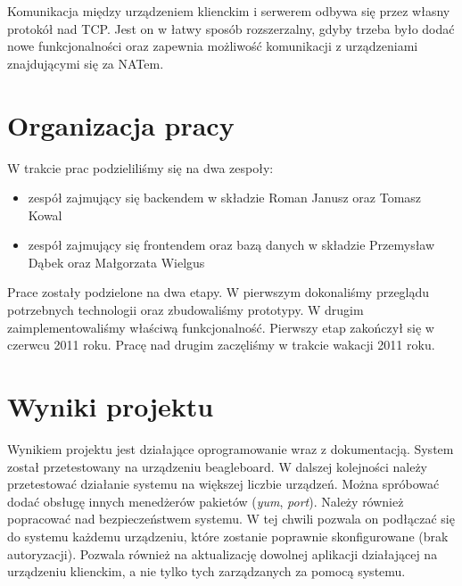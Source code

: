 \documentclass[polish,12pt]{aghthesis}
\begin{document}
Komunikacja między urządzeniem klienckim i serwerem odbywa się przez własny protokół nad TCP. Jest on w łatwy sposób rozszerzalny, gdyby trzeba było dodać nowe funkcjonalności oraz zapewnia możliwość komunikacji z urządzeniami znajdującymi się za NATem.

\section{Organizacja pracy}

W trakcie prac podzieliliśmy się na dwa zespoły:
\begin{itemize}
\item zespół zajmujący się backendem w składzie Roman Janusz oraz Tomasz Kowal
\item zespół zajmujący się frontendem oraz bazą danych w składzie Przemysław Dąbek oraz Małgorzata Wielgus
\end{itemize}

Prace zostały podzielone na dwa etapy. W pierwszym dokonaliśmy przeglądu potrzebnych technologii oraz zbudowaliśmy prototypy. W drugim zaimplementowaliśmy właściwą funkcjonalność.
Pierwszy etap zakończył się w czerwcu 2011 roku. Pracę nad drugim zaczęliśmy w trakcie wakacji 2011 roku.

\section{Wyniki projektu}

Wynikiem projektu jest działające oprogramowanie wraz z dokumentacją. System został przetestowany na urządzeniu beagleboard. W dalszej kolejności należy przetestować działanie systemu na większej liczbie urządzeń. Można spróbować dodać obsługę innych menedżerów pakietów (\emph{yum}, \emph{port}). Należy również popracować nad bezpieczeństwem systemu. W tej chwili pozwala on podłączać się do systemu każdemu urządzeniu, które zostanie poprawnie skonfigurowane (brak autoryzacji). Pozwala również na aktualizację dowolnej aplikacji działającej na urządzeniu klienckim, a nie tylko tych zarządzanych za pomocą systemu.
\end{document}
